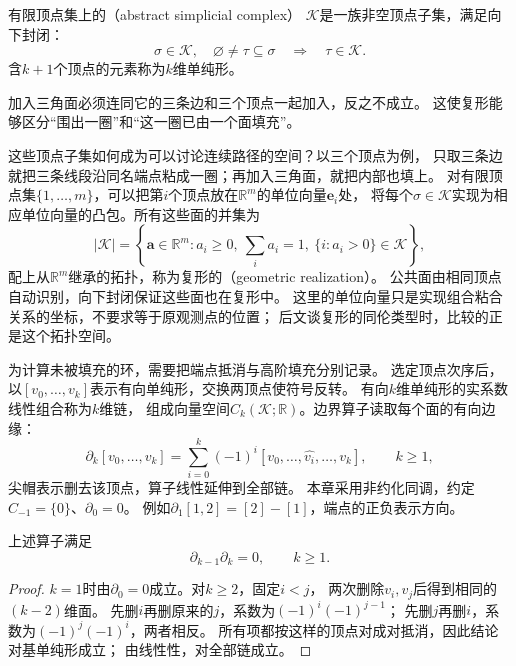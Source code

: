 \begin{definition}[抽象单纯复形]
\label{def:geometry-simplicial-complex}
有限顶点集上的（abstract simplicial complex）
$\mathcal K$是一族非空顶点子集，满足向下封闭：
\begin{equation}
 \sigma\in\mathcal K,\quad\varnothing\neq\tau\subseteq\sigma
 \quad\Longrightarrow\quad\tau\in\mathcal K.
 \label{eq:geometry-simplicial-complex-closure}
\end{equation}
含$k+1$个顶点的元素称为$k$维单纯形。
\end{definition}
加入三角面必须连同它的三条边和三个顶点一起加入，反之不成立。
这使复形能够区分“围出一圈”和“这一圈已由一个面填充”。

这些顶点子集如何成为可以讨论连续路径的空间？以三个顶点为例，
只取三条边就把三条线段沿同名端点粘成一圈；再加入三角面，就把内部也填上。
对有限顶点集$\{1,\ldots,m\}$，可以把第$i$个顶点放在$\mathbb R^m$的单位向量$\bm e_i$处，
将每个$\sigma\in\mathcal K$实现为相应单位向量的凸包。所有这些面的并集为
\[
 |\mathcal K|=
 \left\{\bm a\in\mathbb R^m:
 a_i\geq0,\ \sum_i a_i=1,\ \{i:a_i>0\}\in\mathcal K\right\},
\]
配上从$\mathbb R^m$继承的拓扑，称为复形的（geometric realization）。
公共面由相同顶点自动识别，向下封闭保证这些面也在复形中。
这里的单位向量只是实现组合粘合关系的坐标，不要求等于原观测点的位置；
后文谈复形的同伦类型时，比较的正是这个拓扑空间。


为计算未被填充的环，需要把端点抵消与高阶填充分别记录。
选定顶点次序后，以$[v_0,\ldots,v_k]$表示有向单纯形，交换两顶点使符号反转。
有向$k$维单纯形的实系数线性组合称为$k$维链，
组成向量空间$C_k(\mathcal K;\mathbb R)$。边界算子读取每个面的有向边缘：
\begin{equation}
 \partial_k[v_0,\ldots,v_k]
 =\sum_{i=0}^k(-1)^i[v_0,\ldots,\widehat{v_i},\ldots,v_k],
 \qquad k\geq1,
 \label{eq:geometry-simplicial-boundary}
\end{equation}
尖帽表示删去该顶点，算子线性延伸到全部链。
本章采用非约化同调，约定$C_{-1}=\{0\}$、$\partial_0=0$。
例如$\partial_1[1,2]=[2]-[1]$，端点的正负表示方向。

\begin{lemma}[边界的边界为零]
\label{lem:geometry-boundary-squared-zero}
上述算子满足
\begin{equation}
 \partial_{k-1}\partial_k=0,\qquad k\geq1.
 \label{eq:geometry-boundary-squared-zero}
\end{equation}
\end{lemma}
\begin{proof}
$k=1$时由$\partial_0=0$成立。对$k\geq2$，固定$i<j$，
两次删除$v_i,v_j$后得到相同的$(k-2)$维面。
先删$i$再删原来的$j$，系数为$(-1)^i(-1)^{j-1}$；
先删$j$再删$i$，系数为$(-1)^j(-1)^i$，两者相反。
所有项都按这样的顶点对成对抵消，因此结论对基单纯形成立；
由线性性，对全部链成立。
\end{proof}

